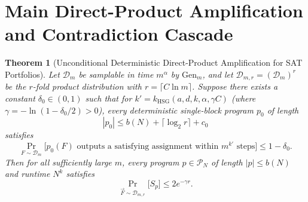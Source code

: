 \documentclass[11pt]{article}
\newtheorem{theorem}{Theorem}
\begin{document}
\section{Main Direct-Product Amplification and Contradiction Cascade}

\begin{theorem}[Unconditional Deterministic Direct-Product Amplification for SAT Portfolios]\label{thm:main-dp}
Let $\mathcal{D}_m$ be samplable in time $m^\alpha$ by $\mathrm{Gen}_m$, and let $\mathcal{D}_{m,r} = (\mathcal{D}_m)^r$ be the $r$-fold product distribution with $r = \lceil C \ln m \rceil$. Suppose there exists a constant $\delta_0 \in (0,1)$ such that for $k' = k_{\mathrm{HSG}}(a,d,k,\alpha, \gamma C)$ (where $\gamma = -\ln(1 - \delta_0/2) > 0$), every deterministic single-block program $p_0$ of length
\[
  |p_0| \le b(N) + \lceil \log_2 r \rceil + c_0
\]
satisfies
\begin{equation}\label{eq:single-block-hardness}
  \Pr_{F \sim \mathcal{D}_m}\big[ p_0(F) \text{ outputs a satisfying assignment within } m^{k'} \text{ steps} \big] \le 1 - \delta_0.
\end{equation}
Then for all sufficiently large $m$, every program $p \in \mathcal{P}_N$ of length $|p| \le b(N)$ and runtime $N^k$ satisfies
\begin{equation}\label{eq:exp-decay}
  \Pr_{\vec{F} \sim \mathcal{D}_{m,r}}\big[ S_p \big] \le 2 e^{-\gamma r}.
\end{equation}
\end{theorem}
\end{document}
